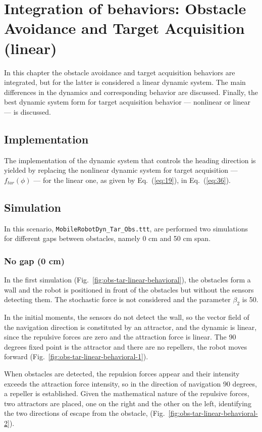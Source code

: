 \renewcommand{\baselinestretch}{1.0}
\chapter{Integration of behaviors: Obstacle Avoidance and Target Acquisition (linear)}%
\label{ch:obstacle-target-linear}
\renewcommand{\baselinestretch}{1.5}
In this chapter the obstacle avoidance and target acquisition behaviors are
integrated, but for the latter is considered a linear dynamic system. The main
differences in the dynamics and corresponding behavior are discussed. Finally,
the best dynamic system form for target acquisition behavior --- nonlinear or linear --- is discussed.

\section{Implementation}%
\label{sec:implementation-obs-tar-linear}
The implementation of the dynamic system that controls the heading direction is
yielded by replacing the nonlinear dynamic system for target acquisition
--- $f_{tar}(\phi)$ --- for the
linear one, as given by Eq.~(\ref{eq:19}), in Eq.~(\ref{eq:36}).

\section{Simulation}
In this scenario, \texttt{MobileRobotDyn\_Tar\_Obs.ttt}, are performed two
simulations for different gaps between obstacles, namely 0 cm and 50 cm span.

\subsection{No gap (0 cm)}%
\label{sec:no-gap-linear}
In the first simulation (Fig.~\ref{fig:obs-tar-linear-behavioral}), the
obstacles form a wall and the robot is positioned in front of the
obstacles but without the sensors detecting them. 
The stochastic force is not considered and the parameter $\beta _{2}$ is 50.

In the initial moments, the sensors do not detect the wall, so the vector field
of the navigation direction is constituted by an attractor, and the dynamic is
linear, since the repulsive forces are zero and the attraction force is
linear. The 90 degrees fixed point is the attractor and there are no repellers,
the robot moves forward (Fig.~\ref{fig:obs-tar-linear-behavioral-1}).

When obstacles are detected, the repulsion forces appear and their intensity
exceeds the attraction force intensity, so in the direction of navigation 90
degrees, a repeller is established. Given the mathematical nature of the
repulsive forces, two attractors are placed, one on the right and the other on
the left, identifying the two directions of escape from the obstacle, (Fig.~\ref{fig:obs-tar-linear-behavioral-2}).

